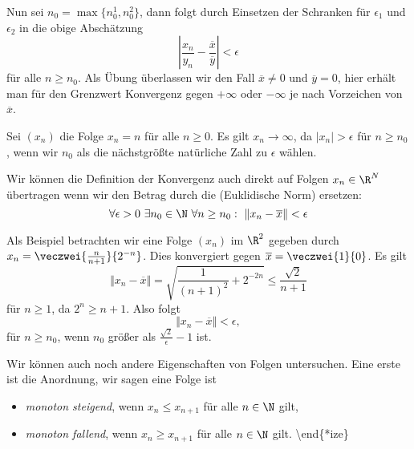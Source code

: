 \documentclass[letterpaper,10pt,english]{jupyterBook}
\begin{document}
Nun sei \(n_0 = \max\{n_0^1,n_0^2\}\), dann folgt durch Einsetzen der Schranken für \(\epsilon_1\) und \(\epsilon_2\) in die obige Abschätzung
\begin{equation*}
  \left\vert \frac{x_n}{y_n} -\frac{\overline{x}}{\overline{y}} \right\vert < \epsilon\end{equation*}
für alle \(n \geq n_0\). Als Übung überlassen wir den Fall \(\overline{x} \neq 0\) und \(\overline{y}=0\), hier erhält man für den Grenzwert Konvergenz gegen \(+\infty\) oder \(-\infty\) je nach Vorzeichen von \(\overline{x}\).
\label{vorkurs/folgen:example-5}
\begin{example}{}{}



Sei \((x_n)\) die  Folge \(x_n = n \) für alle \(n\geq 0\). Es gilt \(x_n \rightarrow \infty\), da \(\vert x_n \vert > \epsilon\) für \(n\geq n_0\), wenn wir \(n_0\) als die nächstgrößte natürliche Zahl zu \(\epsilon\) wählen.
\end{example}

Wir können die Definition der Konvergenz auch direkt auf Folgen \(x_n \in \R^N\) übertragen wenn wir den Betrag durch die (Euklidische Norm) ersetzen:
\begin{equation*}
 \forall \epsilon > 0 ~\exists n_0 \in \N ~\forall n \geq n_0: ~\Vert x_n - \overline{x} \Vert < \epsilon\end{equation*}\label{vorkurs/folgen:example-6}
\begin{example}{}{}



Als Beispiel betrachten wir eine Folge \((x_n)\) im \(\R^2\) gegeben durch \(x_n= \veczwei{\frac{n}{n+1}}{2^{-n}}\). Dies konvergiert gegen \(\overline{x}=\veczwei{1}{0}\). Es gilt
\begin{equation*}
 \Vert x_n - \overline{x} \Vert = \sqrt{\frac{1}{(n+1)^2} + 2^{-2n}} \leq \frac{\sqrt{2}}{n+1}\end{equation*}
für \(n \geq 1\), da \(2^n \geq n+1\). Also folgt
\begin{equation*}
 \Vert x_n - \overline{x} \Vert < \epsilon,\end{equation*}
für \(n \geq n_0\), wenn \(n_0\) größer als \(\frac{\sqrt{2}}\epsilon -1\) ist.
\end{example}

Wir können auch noch andere Eigenschaften von Folgen untersuchen. Eine erste ist die Anordnung, wir sagen eine Folge ist
\begin{itemize}
\item {} 
\emph{monoton steigend}, wenn \(x_n \leq x_{n+1}\) für alle \(n\in \N\) gilt,

\item {} 
\emph{monoton fallend}, wenn \(x_n \geq x_{n+1}\) für alle \(n\in \N\) gilt.
\textbackslash{}end\{*ize\}

\end{itemize}
\end{document}
